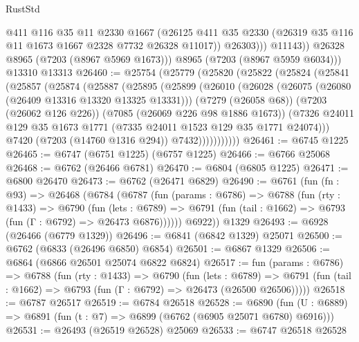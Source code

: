 \begin{lexlean}{RustStd}
\begin{coremodule}
                  @411
                  @116
                  @35
                  @11
                  @2330
                  @1667
                  (@26125
                    @411
                    @35
                    @2330
                    (@26319 @35 @116 @11 @1673 @1667 @2328 @7732 @26328 @11017))
                  @26303)))
            @11143))
        @26328
        @8965
        (@7203 (@8967 @5969 @1673)))
      @8965
      (@7203 (@8967 @5959 @6034)))
    @13310
    @13313
@26460 := @25754
    (@25779
      (@25820
        (@25822
          (@25824
            (@25841
              (@25857
                (@25874
                  (@25887
                    (@25895
                      (@25899
                        (@26010
                          (@26028
                            (@26075 (@26080 (@26409 @13316 @13320 @13325 @13331)))
                            (@7279 (@26058 @68))
                            (@7203 (@26062 @126 @226))
                            (@7085 (@26069 @226 @98 @1886 @1673))
                            (@7326
                              @24011
                              @129
                              @35
                              @1673
                              @1771
                              (@7335 @24011 @1523 @129 @35 @1771 @24074)))
                          @7420
                          (@7203 (@14760 @1316 @294))
                          @7432)))))))))))
@26461 := @6745 @1225
@26465 := @6747 (@6751 @1225) (@6757 @1225)
@26466 := @6766 @25068
@26468 := @6762 (@26466 @6781)
@26470 := @6804 (@6805 @1225)
@26471 := @6800 @26470
@26473 := @6762 (@26471 @6829)
@26490 := @6761
    (fun (fn : @93) =>
    @26468
      (@6784
        (@6787
          (fun (params : @6786) =>
          @6788
            (fun (rty : @1433) =>
            @6790
              (fun (lets : @6789) =>
              @6791 (fun (tail : @1662) => @6793 (fun (Γ : @6792) => @26473 @6876))))))
        @6922))
    @1329
@26493 := @6928 (@26466 (@6779 @1329))
@26496 := @6841 (@6842 @1329) @25071
@26500 := @6762 (@6833 (@26496 @6850) @6854)
@26501 := @6867 @1329
@26506 := @6864 (@6866 @26501 @25074 @6822 @6824)
@26517 := fun (params : @6786) =>
  @6788
    (fun (rty : @1433) =>
    @6790
      (fun (lets : @6789) =>
      @6791 (fun (tail : @1662) => @6793 (fun (Γ : @6792) => @26473 (@26500 @26506)))))
@26518 := @6787 @26517
@26519 := @6784 @26518
@26528 := @6890
    (fun (U : @6889) => @6891 (fun (t : @7) => @6899 (@6762 (@6905 @25071 @6780) @6916)))
@26531 := @26493 (@26519 @26528) @25069
@26533 := @6747 @26518 @26528

\end{coremodule}
\end{lexlean}
